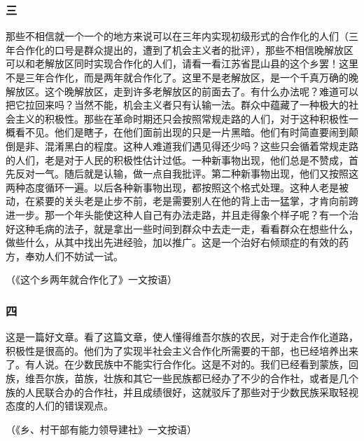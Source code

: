\documentclass[cn,11pt,chinese]{elegantbook}
\def\myformat#1{\hfil\hfil #1}
\begin{document}
\subsubsection*{\myformat{三}}
那些不相信就一个一个的地方来说可以在三年内实现初级形式的合作化的人们（三年合作化的口号是群众提出的，遭到了机会主义者的批评），那些不相信晚解放区可以和老解放区同时实现合作化的人们，请看一看江苏省昆山县的这个乡罢！这里不是三年合作化，而是两年就合作化了。这里不是老解放区，是一个千真万确的晚解放区。这个晚解放区，走到许多老解放区的前面去了。有什么办法呢？难道可以把它拉回来吗？当然不能，机会主义者只有认输一法。群众中蕴藏了一种极大的社会主义的积极性。那些在革命时期还只会按照常规走路的人们，对于这种积极性一概看不见。他们是瞎子，在他们面前出现的只是一片黑暗。他们有时简直要闹到颠倒是非、混淆黑白的程度。这种人难道我们遇见得还少吗？这些只会循着常规走路的人们，老是对于人民的积极性估计过低。一种新事物出现，他们总是不赞成，首先反对一气。随后就是认输，做一点自我批评。第二种新事物出现，他们又按照这两种态度循环一遍。以后各种新事物出现，都按照这个格式处理。这种人老是被动，在紧要的关头老是止步不前，老是需要别人在他的背上击一猛掌，才肯向前跨进一步。那一个年头能使这种人自己有办法走路，并且走得象个样子呢？有一个治好这种毛病的法子，就是拿出一些时间到群众中去走一走，看看群众在想些什么，做些什么，从其中找出先进经验，加以推广。这是一个治好右倾顽症的有效的药方，奉劝人们不妨试一试。\\
\begin{flushright}（《这个乡两年就合作化了》一文按语）\end{flushright}
\subsubsection*{\myformat{四}}
这是一篇好文章。看了这篇文章，使人懂得维吾尔族的农民，对于走合作化道路，积极性是很高的。他们为了实现半社会主义合作化所需要的干部，也已经培养出来了。有人说。在少数民族中不能实行合作化。这是不对的。我们已经看到蒙族，回族，维吾尔族，苗族，壮族和其它一些民族都已经办了不少的合作社，或者是几个族的人民联合办的合作社，并且成绩很好，这就驳斥了那些对于少数民族采取轻视态度的人们的错误观点。\\
\begin{flushright}（《乡、村干部有能力领导建社》一文按语）\end{flushright}
\end{document}
